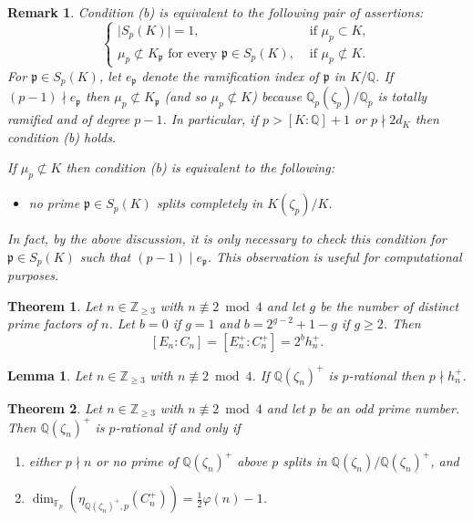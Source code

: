 \documentclass[10pt,a4paper]{amsart}
\newtheorem{theorem}{Theorem}
\newtheorem{remark}{Remark}
\newtheorem{lemma}{Lemma}
\newcommand{\F}{\mathbb{F}}
\newcommand{\Q}{\mathbb{Q}}
\newcommand{\Z}{\mathbb{Z}}
\begin{document}
\begin{remark}\label{rmk:roots-of-unity-condition}
Condition (b) is equivalent to the following pair of assertions:
\[
\begin{cases}
\lvert S_{p}(K) \rvert =1, & \text{ if } \mu_{p} \subset K,  \\
\mu_{p} \not \subset K_{\mathfrak{p}} \text{ for every } \mathfrak{p} \in S_{p}(K),
& \text{ if } \mu_{p} \not \subset K.
\end{cases}
\]
For $\mathfrak{p} \in S_{p}(K)$, let $e_{\mathfrak{p}}$ denote the
ramification index of $\mathfrak{p}$ in $K/\Q$.
If $(p-1) \nmid e_{\mathfrak{p}}$ then $\mu_{p} \not \subset K_{\mathfrak{p}}$ 
(and so $\mu_{p} \not \subset K$) because 
$\Q_{p}(\zeta_{p})/\Q_{p}$ is totally ramified and of degree $p-1$.
In particular, if $p>[K:\Q]+1$ or $p \nmid 2d_{K}$ then condition (b) holds.

If $\mu_{p} \not \subset K$ then condition (b) is equivalent to the following:
\begin{itemize}
    \item no prime $\mathfrak{p} \in S_{p}(K)$ splits completely in $K(\zeta_{p})/K$.
\end{itemize}
In fact, by the above discussion, it is only necessary to check this
condition for $\mathfrak{p} \in S_{p}(K)$ such that $(p-1) \mid e_{\mathfrak{p}}$.
This observation is useful for computational purposes.
\end{remark}

\begin{theorem}\label{thm:sinnott-cyclo}
Let $n \in \Z_{\geq 3}$ with $n \not \equiv 2 \bmod 4$ and
let $g$ be the number of distinct prime factors of $n$.
Let $b=0$ if $g=1$ and $b=2^{g-2}+1-g$ if $g \geq 2$.
Then
\[
[E_{n} : C_{n}] 
=[E_{n}^{+} : C_{n}^{+}] 
= 2^{b}h_{n}^{+}.
\]
\end{theorem}

\begin{lemma}\label{lem:real-cyclo-p-rat-class-number}
Let $n \in \Z_{\geq 3}$ with $n \not \equiv 2 \bmod 4$.
If $\Q(\zeta_{n})^{+}$ is $p$-rational then $p \nmid h_{n}^{+}$.
\end{lemma}

\begin{theorem}\label{thm:p-odd-rat-cyclo}
Let $n \in \Z_{\geq 3}$ with $n \not \equiv 2 \bmod 4$ and let $p$ be an odd prime number.
Then $\Q(\zeta_{n})^{+}$ is $p$-rational if and only if
\begin{enumerate}
    \item either $p \nmid n$ or no prime of $\Q(\zeta_{n})^{+}$ above $p$ splits in $\Q(\zeta_{n})/\Q(\zeta_{n})^{+}$, and
    \item $\dim_{\F_{p}}(\eta_{\Q(\zeta_{n})^{+},p}(C_{n}^{+}))=\frac{1}{2}\varphi(n)-1$.
\end{enumerate}
\end{theorem}
\end{document}
